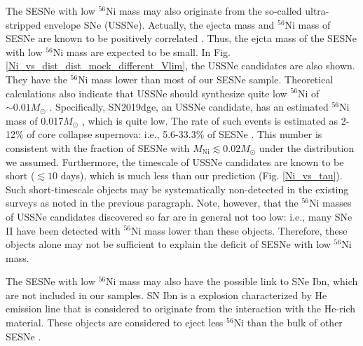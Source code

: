 \documentclass[twocolumn, linenumbers]{aastex62}
\begin{document}
The SESNe with low $^{56}$Ni mass may also originate from the so-called ultra-stripped envelope SNe (USSNe). Actually, the ejecta mass and $^{56}$Ni mass of SESNe are known to be positively correlated \citep{2016MNRAS.457..328L}. Thus, the ejcta mass of the SESNe with low $^{56}$Ni mass are expected to be small. In Fig. \ref{Ni_vs_dist_dist_mock_different_Vlim}, the USSNe candidates are also shown. They have the $^{56}$Ni mass lower than most of our SESNe sample. Theoretical calculations also indicate that USSNe should synthesize quite low $^{56}$Ni of $\sim 0.01 M_{\odot}$ \citep{2015MNRAS.454.3073S, 2017MNRAS.466.2085M}. 
Specifically, SN2019dge, an USSNe candidate, has an estimated $^{56}$Ni mass of 0.017$M_{\odot}$ \citep{2020ApJ...900...46Y}, which is quite low. The rate of such events is estimated as 2-12\% of core collapse supernova: i.e., 5.6-33.3\% of SESNe \citep{2011MNRAS.412.1522S}.
This number is consistent with the fraction of SESNe with $M_{\mathrm{Ni}} \lesssim 0.02 M_{\odot}$ under the distribution we assumed.
 Furthermore, the timescale of USSNe candidates are known to be short ($\lesssim 10$ days), which is much less than our prediction (Fig. \ref{Ni_vs_tau}).
Such short-timescale objects may be systematically non-detected in the existing surveys as noted in the previous paragraph.  
Note, however, that the $^{56}$Ni masses of USSNe candidates discovered so far are in general not too low: i.e., many SNe II have been detected with $^{56}$Ni mass lower than these objects. Therefore, these objects alone may not be sufficient to explain the deficit 
of SESNe with low $^{56}$Ni mass.

The SESNe with low $^{56}$Ni mass may also have the possible link to SNe Ibn, which are not included in our samples. SN Ibn is a explosion characterized by He emission line that is considered to originate from the interaction with the He-rich material. These objects are considered to eject less $^{56}$Ni than the bulk of other SESNe  \citep{2016ApJ...824..100M}.

\end{document}
